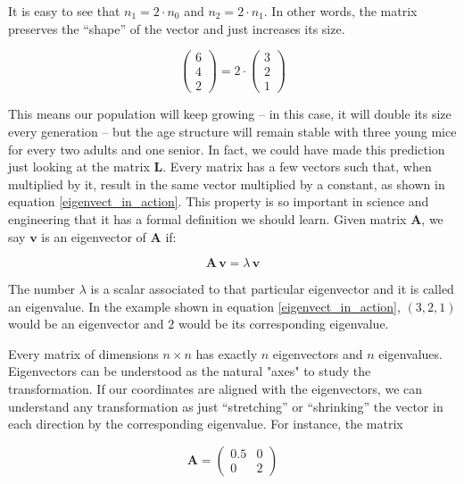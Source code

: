 \documentclass[12pt]{article}
\begin{document}
It is easy to see that $n_1 = 2 \cdot n_0$  and $n_2 = 2 \cdot n_1$. In other words, the matrix preserves the ``shape'' of the vector and just increases its size.

\begin{equation}
 \begin{pmatrix} 6\\ 4 \\ 2\end{pmatrix} =  2 \cdot\begin{pmatrix} 3\\ 2 \\ 1\end{pmatrix} 
 \label{eigenvect_in_action}
\end{equation}

This means our population will keep growing -- in this case, it will double its size every generation -- but the age structure will remain stable with three young mice for every two adults and one senior. In fact, we could have made this prediction just looking at the matrix $\mathbf{L}$. Every matrix has a few vectors such that, when multiplied by it, result in the same vector multiplied by a constant, as shown in equation \ref{eigenvect_in_action}. This property is so important in science and engineering that it has a formal definition we should learn. Given matrix $\mathbf{A}$, we say $\mathbf{v}$ is an eigenvector of  $\mathbf{A}$ if:
 
\begin{equation}
	\label{eigendefinition}
	\mathbf{A} \, \mathbf{v}  = \lambda  \,	\mathbf{v}   
\end{equation}

The number $\lambda$ is a scalar associated to that particular eigenvector and it is called an eigenvalue. In the example shown in equation \ref{eigenvect_in_action}, $(3,2,1)$ would be an eigenvector and $2$ would be its corresponding eigenvalue.

Every matrix of dimensions $n \times n$ has exactly $n$ eigenvectors and $n$ eigenvalues. Eigenvectors can be understood as the natural "axes" to study the transformation. If our coordinates are aligned with the eigenvectors, we can understand any transformation as just ``stretching'' or ``shrinking'' the vector in each direction by the corresponding eigenvalue. For instance, the matrix

\begin{equation}
	\mathbf{A}=\begin{pmatrix} 0.5 & 0\\ 0 &  2 \end{pmatrix} 
\end{equation}
\end{document}
